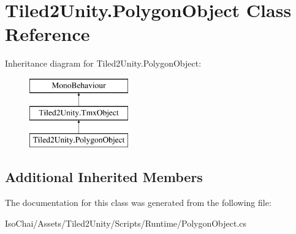 \hypertarget{class_tiled2_unity_1_1_polygon_object}{}\section{Tiled2\+Unity.\+Polygon\+Object Class Reference}
\label{class_tiled2_unity_1_1_polygon_object}
Inheritance diagram for Tiled2\+Unity.\+Polygon\+Object\+:\begin{figure}[H]
\begin{center}
\leavevmode
\includegraphics[height=3.000000cm]{class_tiled2_unity_1_1_polygon_object}
\end{center}
\end{figure}
\subsection*{Additional Inherited Members}


The documentation for this class was generated from the following file\+:\begin{DoxyCompactItemize}
\item 
Iso\+Chai/\+Assets/\+Tiled2\+Unity/\+Scripts/\+Runtime/Polygon\+Object.\+cs\end{DoxyCompactItemize}
